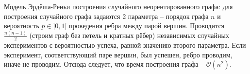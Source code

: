 Модель Эрдёша-Реньи построения случайного неорентированного графа: для построения случайного графа задаются 2 параметра -- порядок графа $n$ и вероятность $p\in ]0,1[$ проведения ребра между парой вершин. Проводится $\frac{n(n-1)}{2}$ (строим граф без петель и кратных рёбер) независимых случайных экспериментов с вероятностью успеха, равной значению второго параметра. Если эксперимент, соответствующий паре вершин, был успешен, ребро проводим, иначе не проводим. Отсюда следует, что время построения графа -- $\mathcal{O}(n^2)$.
